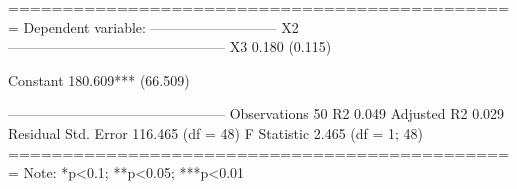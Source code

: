 
===============================================
                        Dependent variable:    
                    ---------------------------
                                X2             
-----------------------------------------------
X3                             0.180           
                              (0.115)          
                                               
Constant                    180.609***         
                             (66.509)          
                                               
-----------------------------------------------
Observations                    50             
R2                             0.049           
Adjusted R2                    0.029           
Residual Std. Error      116.465 (df = 48)     
F Statistic             2.465 (df = 1; 48)     
===============================================
Note:               *p<0.1; **p<0.05; ***p<0.01
